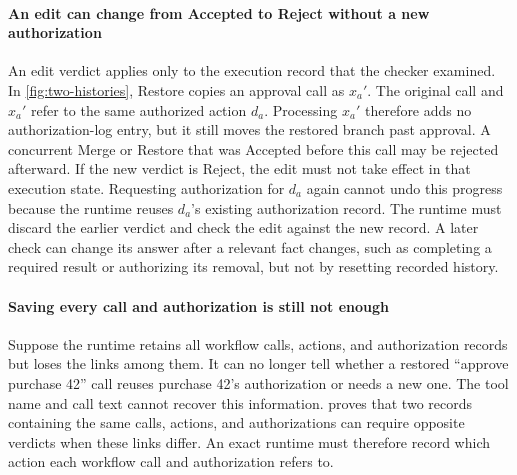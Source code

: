 \paragraph{An edit can change from Accepted to Reject without a new authorization}
An edit verdict applies only to the execution record that the checker examined.
In \cref{fig:two-histories}, Restore copies an approval call as \(x_a'\).
The original call and \(x_a'\) refer to the same authorized action \(d_a\).
Processing \(x_a'\) therefore adds no authorization-log entry, but it still moves the restored branch past approval.
A concurrent Merge or Restore that was Accepted before this call may be rejected afterward.
If the new verdict is Reject, the edit must not take effect in that execution state.
Requesting authorization for \(d_a\) again cannot undo this progress because the runtime reuses \(d_a\)'s existing authorization record.
The runtime must discard the earlier verdict and check the edit against the new record.
A later check can change its answer after a relevant fact changes, such as completing a required result or authorizing its removal, but not by resetting recorded history.

\paragraph{Saving every call and authorization is still not enough}
Suppose the runtime retains all workflow calls, actions, and authorization records but loses the links among them.
It can no longer tell whether a restored ``approve purchase 42'' call reuses purchase 42's authorization or needs a new one.
The tool name and call text cannot recover this information.
 proves that two records containing the same calls, actions, and authorizations can require opposite verdicts when these links differ.
An exact runtime must therefore record which action each workflow call and authorization refers to.

